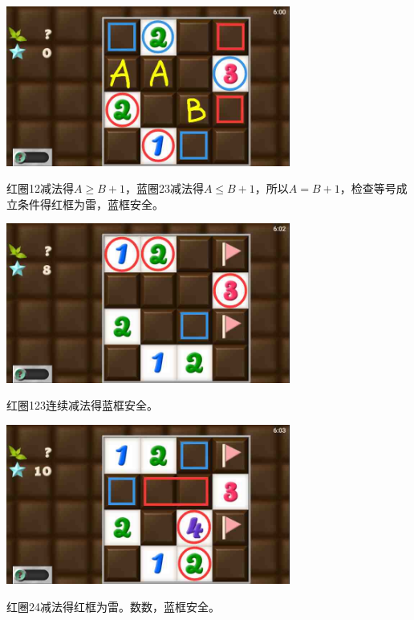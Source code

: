 \subsection{} %
\begin{center}
    \includegraphics[width=0.7\textwidth]{puzzlelow/191-1.jpg}
\end{center}
红圈12减法得$A\ge B+1$，蓝圈23减法得$A\le B+1$，所以$A=B+1$，检查等号成立条件得红框为雷，蓝框安全。
\begin{center}
    \includegraphics[width=0.7\textwidth]{puzzlelow/191-2.jpg}
\end{center}
红圈123连续减法得蓝框安全。
\begin{center}
    \includegraphics[width=0.7\textwidth]{puzzlelow/191-3.jpg}
\end{center}
红圈24减法得红框为雷。数数，蓝框安全。

